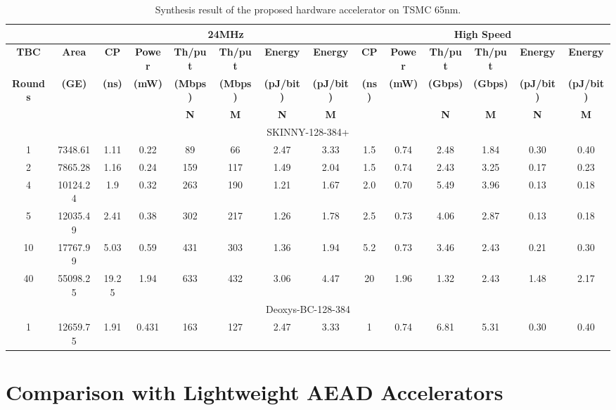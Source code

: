 \documentclass[conference]{IEEEtran}
\begin{document}
\begin{table}
  \centering
  \caption{Synthesis result of the proposed hardware accelerator on TSMC 65nm.}\label{tab:acc65nm}
  \begin{tabular}{c|c|c|c|c|c|c|c|c|c|c|c|c|c}\hline
    \multicolumn{2}{c|}{}&\multicolumn{6}{c|}{\textbf{24MHz}}&\multicolumn{6}{c}{\textbf{High Speed}} \\ \hline
    \textbf{TBC} & \textbf{Area} & \textbf{CP} & \textbf{Power} & \textbf{Th/put} &  \textbf{Th/put} & \textbf{Energy} & \textbf{Energy} & \textbf{CP} & \textbf{Power} & \textbf{Th/put} &  \textbf{Th/put} & \textbf{Energy} & \textbf{Energy}  \\ 
    \textbf{Rounds} & \textbf{(GE)} & \textbf{(ns)} & \textbf{(mW)} & \textbf{(Mbps)} & \textbf{(Mbps)} & \textbf{(pJ/bit)} &  \textbf{(pJ/bit)}  & \textbf{(ns)}& \textbf{(mW)} & \textbf{(Gbps)} & \textbf{(Gbps)} & \textbf{(pJ/bit)} &  \textbf{(pJ/bit)}   \\
    & & &  & \textbf{N} & \textbf{M} &\textbf{N} & \textbf{M}  && & \textbf{N} & \textbf{M} & \textbf{N} & \textbf{M}  \\ \hline \hline
    \multicolumn{14}{c}{SKINNY-128-384+} \\ \hline
    1  & 7348.61   & 1.11	  & 0.22    &  89 &  66 & 2.47	& 3.33 & 1.5 & 0.74 & 2.48 & 1.84 & 0.30 & 0.40 \\ 
    2	 & 7865.28	 & 1.16		& 0.24		& 159 & 117 & 1.49  & 2.04 & 1.5 & 0.74 & 2.43 & 3.25 & 0.17 & 0.23 \\ 
		4	 & 10124.24	 & 1.9		& 0.32		& 263 & 190 & 1.21  & 1.67 & 2.0 & 0.70 & 5.49 & 3.96 & 0.13 & 0.18 \\
    5	 & 12035.49	 & 2.41		& 0.38		& 302 & 217 & 1.26  & 1.78 & 2.5 & 0.73 & 4.06 & 2.87 & 0.13 & 0.18 \\ 
		10 & 17767.99	 & 5.03		& 0.59		& 431 & 303 & 1.36  & 1.94 & 5.2 & 0.73 & 3.46 & 2.43 & 0.21 & 0.30 \\ 
		40 & 55098.25	 & 19.25	& 1.94		& 633 & 432 & 3.06  & 4.47 & 20  & 1.96 & 1.32 & 2.43 & 1.48 & 2.17 \\ \hline\hline
    \multicolumn{14}{c}{Deoxys-BC-128-384} \\ \hline
    1  & 12659.75  & 1.91	  & 0.431   & 163 & 127 & 2.47	& 3.33 & 1   & 0.74 & 6.81 & 5.31 & 0.30 & 0.40  \\ \hline
  \end{tabular}
\end{table}

\section{Comparison with Lightweight AEAD Accelerators}
\end{document}
